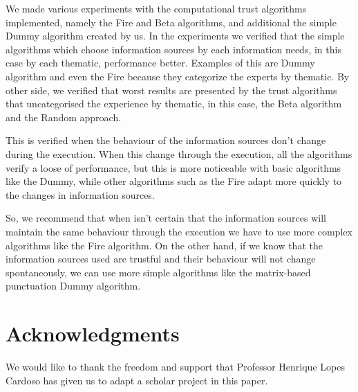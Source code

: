 \documentclass{llncs}
\begin{document}
We made various experiments with the computational trust algorithms implemented, namely the Fire and Beta algorithms, and additional the simple Dummy algorithm created by us. In the experiments we verified that the simple algorithms which choose information sources by each information needs, in this case by each thematic, performance better. Examples of this are Dummy algorithm and even the Fire because they categorize the experts by thematic. By other side, we verified that worst results are presented by the trust algorithms that uncategorised the experience by thematic, in this case, the Beta algorithm and the Random approach.

This is verified when the behaviour of the information sources don't change during the execution. When this change through the execution, all the algorithms verify a loose of performance, but this is more noticeable with basic algorithms like the Dummy, while other algorithms such as the Fire adapt more quickly to the changes in information sources. 


So, we recommend that when isn't certain that the information sources will maintain the same behaviour through the execution we have to use more complex algorithms like the Fire algorithm. On the other hand, if we know that the information sources used are trustful and their behaviour will not change spontaneously, we can use more simple algorithms like the matrix-based punctuation Dummy algorithm.


\section*{Acknowledgments}\label{sec:Acknowledgments}

We would like to thank the freedom and support that Professor Henrique Lopes Cardoso has given us to adapt a scholar project in this paper.
\end{document}
